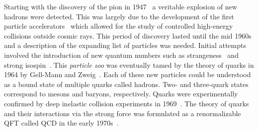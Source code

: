 Starting with the discovery of the pion in 1947~\cite{DiscoveryPimeson} a veritable explosion of new hadrons were detected.
This was largely due to the development of the first particle accelerators~\cite{ProductionHighSpeed} which allowed for the study of controlled high-energy collisions outside cosmic rays.
This period of discovery lasted until the mid 1960s and a description of the expanding list of particles was needed.
Initial attempts involved the introduction of new quantum numbers such as strangeness~\cite{Strange2, Strange3} and strong isospin~\cite{StrongIso1, StrongIso2, StrongIso3,StrongIso4}.
This \textit{particle zoo} was eventually tamed by the theory of quarks in 1964 by Gell-Mann and Zweig~\cite{GellMan1964,Zweig1964}.
Each of these new particles could be understood as a bound state of multiple quarks called hadrons.
Two- and three-quark states correspond to mesons and baryons, respectively.
Quarks were experimentally confirmed by deep inelastic collision experiments in 1969~\cite{Quark1, Quark2}.
The theory of quarks and their interactions via the strong force was formulated as a renormalizable \Gls{QFT} called \Gls{QCD} in the early 1970s~\cite{QCD1,QCD2,QCD3}.

